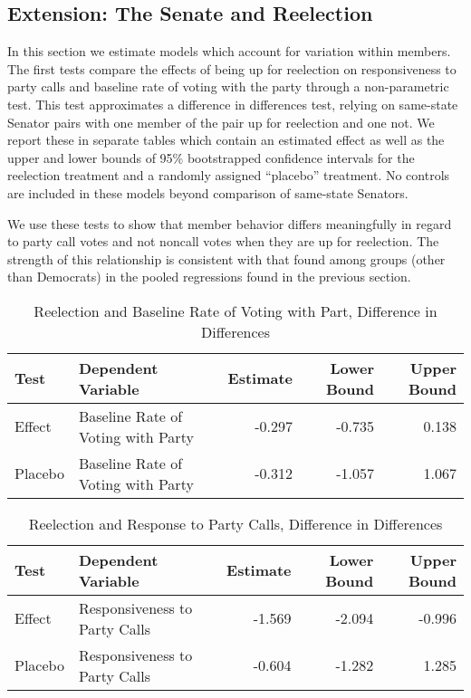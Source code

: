 \documentclass[12pt]{article}
\begin{document}
\subsection{Extension: The Senate and Reelection}

In this section we estimate models which account for variation within members. The first tests compare the effects of being up for reelection on responsiveness to party calls and baseline rate of voting with the party through a non-parametric test. This test approximates a difference in differences test, relying on same-state Senator pairs with one member of the pair up for reelection and one not. We report these in separate tables which contain an estimated effect as well as the upper and lower bounds of 95\% bootstrapped confidence intervals for the reelection treatment and a randomly assigned ``placebo'' treatment. No controls are included in these models beyond comparison of same-state Senators. 

We use these tests to show that member behavior differs meaningfully in regard to party call votes and not noncall votes when they are up for reelection. The strength of this relationship is consistent with that found among groups (other than Democrats) in the pooled regressions found in the previous section.



\begin{table}[H]
	\centering
	\caption{Reelection and Baseline Rate of Voting with Part, Difference in Differences} 
	\begin{tabular}{llrrr}
		\hline
		Test & Dependent Variable & Estimate & Lower Bound & Upper Bound \\ 
		\hline
		Effect & Baseline Rate of Voting with Party & -0.297 & -0.735 & 0.138 \\ 
		Placebo & Baseline Rate of Voting with Party & -0.312 & -1.057 & 1.067 \\ 
		\hline
	\end{tabular}
\end{table}

\begin{table}[H]
	\centering
	\caption{Reelection and Response to Party Calls, Difference in Differences} 
	\begin{tabular}{llrrr}
		\hline
		Test & Dependent Variable & Estimate & Lower Bound & Upper Bound \\ 
		\hline
		Effect & Responsiveness to Party Calls & -1.569 & -2.094 & -0.996 \\ 
		Placebo & Responsiveness to Party Calls & -0.604 & -1.282 & 1.285 \\ 
		\hline
	\end{tabular}
\end{table}
\end{document}

